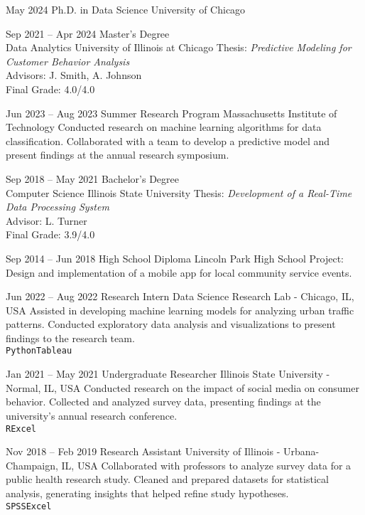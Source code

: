 \documentclass[9pt]{cvitae}
\begin{document}
\begin{entrylist}

    \entry
        {May 2024}
        {Ph.D. in Data Science}
        {University of Chicago}
        {}
        
    \entry
        {Sep 2021 -- Apr 2024}
        {Master's Degree \\ Data Analytics}
        {University of Illinois at Chicago}
        {Thesis: \textit{Predictive Modeling for Customer Behavior Analysis}\\
        Advisors: J. Smith, A. Johnson\\
        Final Grade: 4.0/4.0}

    \entry
        {Jun 2023 -- Aug 2023}
        {Summer Research Program}
        {Massachusetts Institute of Technology}
        {Conducted research on machine learning algorithms for data classification. Collaborated with a team to develop a predictive model and present findings at the annual research symposium.}

    \entry
        {Sep 2018 -- May 2021}
        {Bachelor's Degree \\ Computer Science}
        {Illinois State University}
        {Thesis: \textit{Development of a Real-Time Data Processing System}\\
        Advisor: L. Turner\\
        Final Grade: 3.9/4.0}

    \entry
        {Sep 2014 -- Jun 2018}
        {High School Diploma}
        {Lincoln Park High School}
        {Project: Design and implementation of a mobile app for local community service events.}        
\end{entrylist}


\begin{entrylist}
    \entry
        {Jun 2022 -- Aug 2022}
        {Research Intern}
        {Data Science Research Lab - Chicago, IL, USA}
        {Assisted in developing machine learning models for analyzing urban traffic patterns. Conducted exploratory data analysis and visualizations to present findings to the research team.\\
        \texttt{Python}\slashsep\texttt{Tableau}}

    \entry
        {Jan 2021 -- May 2021}
        {Undergraduate Researcher}
        {Illinois State University - Normal, IL, USA}
        {Conducted research on the impact of social media on consumer behavior. Collected and analyzed survey data, presenting findings at the university's annual research conference.\\
        \texttt{R}\slashsep\texttt{Excel}}

    \entry
        {Nov 2018 -- Feb 2019}
        {Research Assistant}
        {University of Illinois - Urbana-Champaign, IL, USA}
        {Collaborated with professors to analyze survey data for a public health research study. Cleaned and prepared datasets for statistical analysis, generating insights that helped refine study hypotheses.\\
        \texttt{SPSS}\slashsep\texttt{Excel}}
\end{entrylist}
\end{document}
